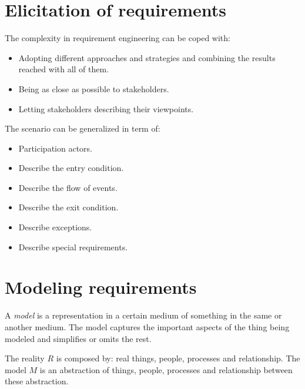 \documentclass[12pt, a4paper]{report}
\newtheorem[style=M,bodystyle=\normalfont]{theorem}{Theorem}
\newtheorem[style=M,bodystyle=\normalfont]{corollary}{Corollary}
\newtheorem[style=M,bodystyle=\normalfont]{lemma}{Lemma}
\newtheorem[style=M,bodystyle=\normalfont]{definition}{Definition}
\begin{document}
    \section{Elicitation of requirements}
    The complexity in requirement engineering can be coped with:
    \begin{itemize}
        \item Adopting different approaches and strategies and combining the results reached with all of them.
        \item Being as close as possible to stakeholders.
        \item Letting stakeholders describing their viewpoints.
    \end{itemize}
    The scenario can be generalized in term of:
    \begin{itemize}
        \item Participation actors.
        \item Describe the entry condition.
        \item Describe the flow of events.
        \item Describe the exit condition.
        \item Describe exceptions.
        \item Describe special requirements.
    \end{itemize}

    \section{Modeling requirements}
    \begin{definition}
        A \emph{model} is a representation in a certain medium of something in the same or another medium. The model captures the important aspects of the thing being modeled and 
        simplifies or omits the rest. 
    \end{definition}
    The reality $R$ is composed by: real things, people, processes and relationship. The model $M$ is an abstraction of things, people, processes and relationship between these 
    abstraction. 
     
\end{document}
